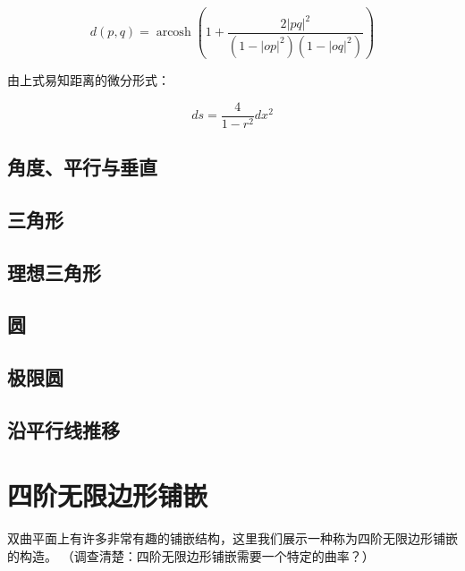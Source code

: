 \documentclass[a4paper,12pt]{article}
\begin{document}
$$d(p,q) = \operatorname{arcosh} \left( 1 + \frac{2 |pq|^2}{(1-|op|^2)(1-|oq|^2)} \right) $$

由上式易知距离的微分形式：

$$ ds = \frac{4}{1 - r^2} dx^2 $$

\newpage

\subsection{角度、平行与垂直}

\newpage

\subsection{三角形}

\newpage

\subsection{理想三角形}

\newpage

\subsection{圆}

\newpage

\subsection{极限圆}

\newpage

\subsection{沿平行线推移}

\newpage

\section{四阶无限边形铺嵌}

双曲平面上有许多非常有趣的铺嵌结构，这里我们展示一种称为四阶无限边形铺嵌的构造。
（调查清楚：四阶无限边形铺嵌需要一个特定的曲率？）
\end{document}
